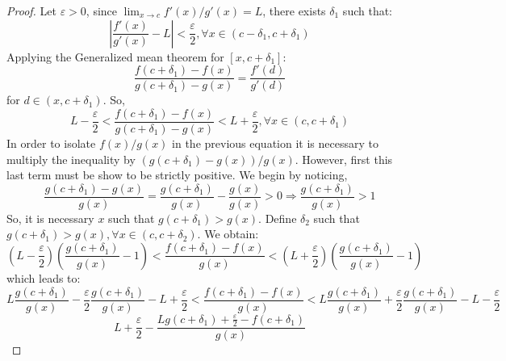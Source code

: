 \begin{proof}
    Let $\varepsilon > 0$, since $\lim_{x \to c} f'(x)/g'(x) = L$, there exists $\delta_1$ such that:
    \begin{equation*}
        \left |
            \frac{f'(x)}{g'(x)} - L
        \right | < \frac{\varepsilon}{2}, \forall x \in (c-\delta_1, c+\delta_1)
    \end{equation*}
    Applying the Generalized mean theorem for $[x, c + \delta_1]$:
    \begin{equation*}
        \frac{f(c + \delta_1) - f(x)}{g(c + \delta_1) - g(x)} = \frac{f'(d)}{g'(d)}
    \end{equation*}
    for $d \in (x, c + \delta_1)$. So,
    \begin{equation*}
        L -  \frac{\varepsilon}{2} < \frac{f(c + \delta_1) - f(x)}{g(c + \delta_1) - g(x)} < L + \frac{\varepsilon}{2}, \forall x \in (c, c+\delta_1)
    \end{equation*}
    In order to isolate $f(x)/g(x)$ in the previous equation it is necessary to multiply the inequality by $(g(c+\delta_1) - g(x))/g(x)$. However, first this last term must be show to be strictly positive. We begin by noticing,
    \begin{equation*}
        \frac{g(c+\delta_1) - g(x)}{g(x)} = \frac{g(c+\delta_1)}{g(x)} - \frac{g(x)}{g(x)} > 0 \Longrightarrow \frac{g(c+\delta_1)}{g(x)} > 1
    \end{equation*}
    So, it is necessary $x$ such that $g(c + \delta_1) > g(x)$. Define $\delta_2$ such that $g(c + \delta_1) > g(x), \forall x \in (c, c+\delta_2)$. We obtain:
    \begin{equation*}
        \left( L - \frac{\varepsilon}{2} \right)
        \left( \frac{g(c+\delta_1)}{g(x)} - 1 \right)
        <
        \frac{f(c+\delta_1) - f(x)}{g(x)}
        <
        \left( L + \frac{\varepsilon}{2} \right)
        \left( \frac{g(c+\delta_1)}{g(x)} - 1 \right)
    \end{equation*}
    which leads to:
    \begin{equation*}
        L\frac{g(c+\delta_1)}{g(x)} - \frac{\varepsilon}{2}\frac{g(c+\delta_1)}{g(x)}
        - L + \frac{\varepsilon}{2}
        <
        \frac{f(c+\delta_1) - f(x)}{g(x)}
        <
        L\frac{g(c+\delta_1)}{g(x)} + \frac{\varepsilon}{2}\frac{g(c+\delta_1)}{g(x)}
        - L - \frac{\varepsilon}{2}
    \end{equation*}
    \begin{equation*}
        L + \frac{\varepsilon}{2} - \frac{Lg(c+\delta_1) + \frac{\varepsilon}{2} - f(c+\delta_1)}{g(x)}

\end{equation*}
\end{proof}
